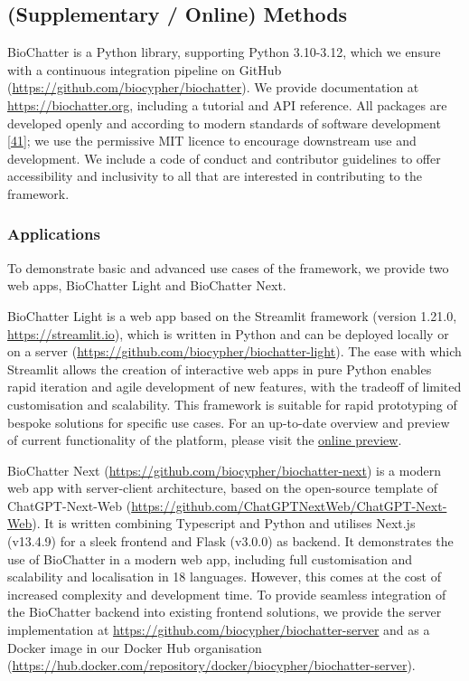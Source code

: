 \hypertarget{supplementary-online-methods}{%
\subsection{(Supplementary / Online) Methods}\label{supplementary-online-methods}}

BioChatter is a Python library, supporting Python 3.10-3.12, which we ensure with a continuous integration pipeline on GitHub (\url{https://github.com/biocypher/biochatter}).
We provide documentation at \url{https://biochatter.org}, including a tutorial and API reference.
All packages are developed openly and according to modern standards of software development {[}\protect\hyperlink{ref-MMp6cQ1x}{41}{]}; we use the permissive MIT licence to encourage downstream use and development.
We include a code of conduct and contributor guidelines to offer accessibility and inclusivity to all that are interested in contributing to the framework.

\hypertarget{applications}{%
\subsubsection{Applications}\label{applications}}

To demonstrate basic and advanced use cases of the framework, we provide two web apps, BioChatter Light and BioChatter Next.

BioChatter Light is a web app based on the Streamlit framework (version 1.21.0, \url{https://streamlit.io}), which is written in Python and can be deployed locally or on a server (\url{https://github.com/biocypher/biochatter-light}).
The ease with which Streamlit allows the creation of interactive web apps in pure Python enables rapid iteration and agile development of new features, with the tradeoff of limited customisation and scalability.
This framework is suitable for rapid prototyping of bespoke solutions for specific use cases.
For an up-to-date overview and preview of current functionality of the platform, please visit the \href{https://chat.biocypher.org}{online preview}.

BioChatter Next (\url{https://github.com/biocypher/biochatter-next}) is a modern web app with server-client architecture, based on the open-source template of ChatGPT-Next-Web (\url{https://github.com/ChatGPTNextWeb/ChatGPT-Next-Web}).
It is written combining Typescript and Python and utilises Next.js (v13.4.9) for a sleek frontend and Flask (v3.0.0) as backend.
It demonstrates the use of BioChatter in a modern web app, including full customisation and scalability and localisation in 18 languages.
However, this comes at the cost of increased complexity and development time.
To provide seamless integration of the BioChatter backend into existing frontend solutions, we provide the server implementation at \url{https://github.com/biocypher/biochatter-server} and as a Docker image in our Docker Hub organisation (\url{https://hub.docker.com/repository/docker/biocypher/biochatter-server}).

